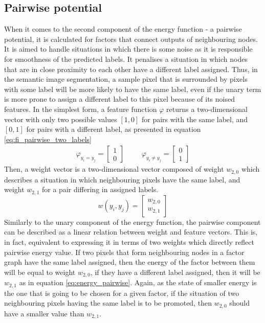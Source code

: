 \subsection{Pairwise potential}
\label{sec:pariwise_potential}
When it comes to the second component of the energy function - a pairwise potential, it is calculated for factors that connect outputs of neighbouring nodes. It is aimed to handle situations in which there is some noise as it is responsible for smoothness of the predicted labels. It penalises a situation in which nodes that are in close proximity to each other have a different label assigned. Thus, in the semantic image segmentation, a sample pixel that is surrounded by pixels with some label will be more likely to have the same label, even if the unary term is more prone to assign a different label to this pixel because of its noised features. In the simplest form, a feature function $\varphi$ returns a two-dimensional vector with only two possible values $[1,0]$ for pairs with the same label, and $[0,1]$ for pairs with a different label, as presented in equation \ref{eq:fi_pairwise_two_labels}
\begin{equation}
    \label{eq:fi_pairwise_two_labels}
    \begin{matrix}
        \varphi_{y_i = y_j} = \begin{bmatrix}
            1 \\
            0
        \end{bmatrix} & & &
        \varphi_{y_i \neq y_j} = \begin{bmatrix}
            0 \\
            1
        \end{bmatrix}
    \end{matrix}
\end{equation}
Then, a weight vector is a two-dimensional vector composed of weight $w_{2,0}$ which describes a situation in which neighbouring pixels have the same label, and weight $w_{2,1}$ for a pair differing in assigned labels. 
\begin{equation}
    \label{eq:weight_pairwise}
    w(y_i, y_j) = \begin{bmatrix}
        w_{2,0} \\ 
        w_{2,1}
    \end{bmatrix}
\end{equation}
Similarly to the unary component of the energy function, the pairwise component can be described as a linear relation between weight and feature vectors. This is, in fact,  equivalent to expressing it in terms of two weights which directly reflect pairwise energy value. If two pixels that form neighbouring nodes in a factor graph have the same label assigned, then the energy of the factor between them will be equal to weight $w_{2,0}$, if they have a different label assigned, then it will be $w_{2,1}$ as in equation \ref{eq:energy_pairwise}. Again, as the state of smaller energy is the one that is going to be chosen for a given factor, if the situation of two neighbouring pixels having the same label is to be promoted, then $w_{2,0}$ should have a smaller value than $w_{2,1}$.
